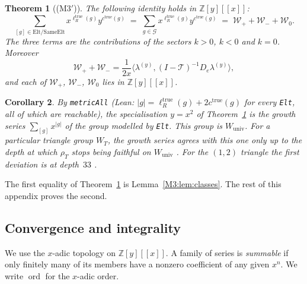 \documentclass[11pt]{article}
\theoremstyle{plain}
\newtheorem{theorem}{Theorem}
\newtheorem{corollary}[theorem]{Corollary}
\theoremstyle{definition}
\theoremstyle{remark}
\begin{document}
\begin{theorem}[\textup{(M3$'$)}]\label{thm:M3prime}
The following identity holds in $\mathbb Z[y][[x]]$:
\[
  \sum_{[g]\in\mathrm{Elt}/\mathrm{SameElt}}x^{\ell_R^{\mathrm{true}}(g)}y^{c^{\mathrm{true}}(g)}
  \;=\;\sum_{g\in\mathcal G}x^{\ell_R^{\mathrm{true}}(g)}y^{c^{\mathrm{true}}(g)}
  \;=\;\mathcal W_++\mathcal W_-+\mathcal W_0 .
\]
The three terms are the contributions of the sectors $k>0$, $k<0$ and $k=0$. Moreover
\[
  \mathcal W_++\mathcal W_-=\frac1{2x}\bigl\langle\lambda^{(y)},(I-\mathcal T)^{-1}D_e\lambda^{(y)}\bigr\rangle ,
\]
and each of $\mathcal W_+$, $\mathcal W_-$, $\mathcal W_0$ lies in $\mathbb Z[y][[x]]$.
\end{theorem}

\begin{corollary}\label{cor:M3prime-growth}
By \texttt{metricAll} (Lean: $|g|=\ell_R^{\mathrm{true}}(g)+2c^{\mathrm{true}}(g)$ for every
\texttt{Elt}, all of which are reachable), the specialisation $y=x^2$ of
Theorem~\ref{thm:M3prime} is the growth series $\sum_{[g]}x^{|g|}$ of the group modelled by
\texttt{Elt}. This group is $W_{\mathrm{univ}}$. For a particular triangle group $W_T$, the
growth series agrees with this one only up to the depth at which $\rho_T$ stops being
faithful on $W_{\mathrm{univ}}$
\cite[Theorem ``Effective universality'', \textup{thm:effective-universality}]{Bonfioli2026a}. For
the $(1,2)$ triangle the first deviation is at depth~$33$
\cite[\textup{thm:universality-sharp}]{Bonfioli2026a}.
\end{corollary}

The first equality of Theorem~\ref{thm:M3prime} is Lemma~\ref{M3:lem:classes}. The rest of this
appendix proves the second.

\subsection{Convergence and integrality}\label{app:conv}

We use the $x$-adic topology on $\mathbb Z[y][[x]]$. A family of series is \emph{summable}
if only finitely many of its members have a nonzero coefficient of any given $x^n$. We write
$\operatorname{ord}$ for the $x$-adic order.
\end{document}
